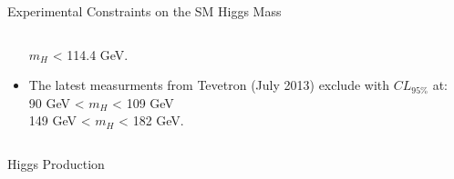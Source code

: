 \begin{frame}{Experimental Constraints on the SM Higgs Mass}
\begin{center}
\begin{columns}
\begin{column}{0.5\textwidth}
\begin{itemize}
  \vspace{.5em}
  $m_H$ < 114.4 GeV.\\
  \vspace{1em}
\item
  The latest measurments from Tevetron (July 2013) exclude with $CL_{95\%}$ at:\\
  \vspace{.5em}
  90 GeV < $m_H$ < 109 GeV\\
  149 GeV < $m_H$ < 182 GeV.
\end{itemize}
\end{column}
\end{columns}
\end{center}
\end{frame}



\begin{frame}{Higgs Production}
\begin{center}
\begin{columns}
  \begin{column}{0.35\textwidth}

\end{column}
\end{columns}
\end{center}
\end{frame}
